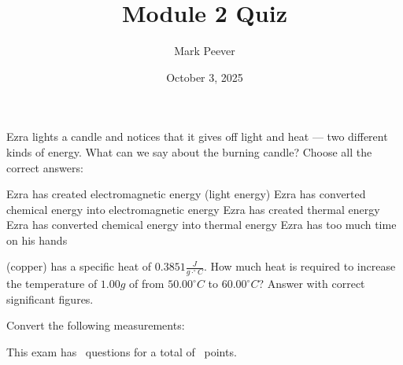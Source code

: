 \documentclass[11pt,addpoints]{exam}   	%
\title{Module 2 Quiz}
\author{Mark Peever}
\date{October 3, 2025}							%
\begin{document}
\maketitle

\pointsinrightmargin

\begin{center}
\end{center}
\vspace{0.1in}
\vspace{0.2in}

\begin{questions}
\question[5] Ezra lights a candle and notices that it gives off light and heat --- two different kinds of energy.
What can we say about the burning candle? Choose all the correct answers:

\begin{choices}
\choice Ezra has created electromagnetic energy (light energy)
\choice Ezra has converted chemical energy into electromagnetic energy
\choice Ezra has created thermal energy
\choice Ezra has converted chemical energy into thermal energy
\choice Ezra has too much time on his hands
\end{choices}


\question[5]
 (copper) has a specific heat of $0.3851 \frac{J}{g \cdot ^{\circ}C}$.
How much heat is required to increase the temperature of $1.00g$ of  from $50.00 ^{\circ}C$ to $60.00 ^{\circ}C$? 
Answer with correct significant figures. 



\question
Convert the following measurements:

\end{questions}

\begin{center}
This exam has \numquestions\ questions for a total of \numpoints\ points.
\end{center}
\end{document}
